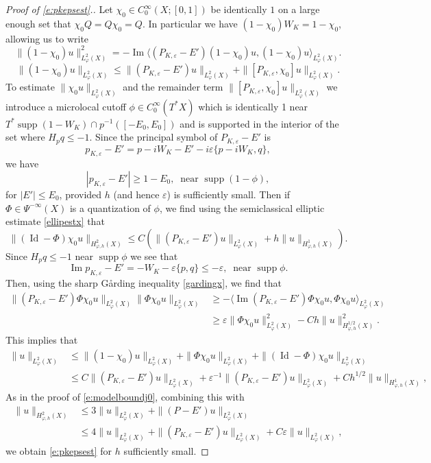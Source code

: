 \documentclass[reqno, 12pt]{amsart}
\newcommand \Oh {\mathcal{O}}
\newcommand \la {\langle}
\newcommand \ra {\rangle}
\newcommand \eps {\varepsilon}
\DeclareMathOperator \im {Im}
\DeclareMathOperator \supp {supp}
\DeclareMathOperator \Id {Id}
\theoremstyle{definition}
\numberwithin{equation}{section}
\numberwithin{prop}{section}
\numberwithin{figure}{section}
\begin{document}
\begin{proof}[Proof of \eqref{e:pkepsest}.]
Let $\chi_0 \in C_0^\infty(X;[0,1])$ be identically $1$ on a large enough set that $\chi_0 Q = Q \chi_0 = Q$. In particular we have $(1-\chi_0) W_K = 1-\chi_0$, allowing us to write
\[
\|(1-\chi_0)u\|_{L^2_\varphi(X)}^2 = -\im \la( P_{K,\eps} - E')(1-\chi_0)u,(1-\chi_0)u\ra_{L^2_\varphi(X)}.
\]
\[
\|(1-\chi_0)u\|_{L^2_\varphi(X)} \le \|(P_{K,\eps} - E' )u\|_{L^2_\varphi(X)} + \|[P_{K,\eps},\chi_0]u\|_{L^2_\varphi(X)}.
\]
To estimate $\|\chi_0 u\|_{L^2_\varphi(X)} $ and the remainder term $\|[P_{K,\eps},\chi_0]u\|_{L^2_\varphi(X)} $ we introduce %
a microlocal cutoff $\phi \in C_0^\infty(T^*X)$ which is identically 1 near $T^*\supp(1-W_K) \cap p^{-1}([-E_0,E_0])$ and is supported in the interior of the set where $H_pq \le -1$. Since the principal symbol of $P_{K,\eps} - E'$ is
\[
p_{K,\eps} - E' = p - i W_K -E' - i\eps \{p - iW_K,q\},
\]
we have
\[
|p_{K,\eps} - E'| \ge 1-E_0, \  \textrm{ near } \supp (1 - \phi),
\]
for $|E'| \le E_0$, provided $h$ (and hence $\eps$) is sufficiently small.  Then if  $\Phi \in \Psi^{-\infty}(X)$ is a quantization of $\phi$, we find using the semiclassical elliptic estimate \eqref{ellipestx} that
\[
\|(\Id - \Phi) \chi_0 u\|_{H^2_{\varphi,h}(X)} \le C\left( \|(P_{K,\eps} - E')u\|_{L^2_\varphi(X)} + h\|u\|_{H^1_{\varphi,h}(X)}\right).
\]
Since $H_pq \le -1$ near $\supp \phi$ we see that
\[
\im p_{K,\eps} - E' = -W_K - \eps \{p,q\} \le - \eps, \ \textrm{ near } \supp \phi.
\]
Then, using the sharp G\aa rding inequality \eqref{gardingx}, we find that
\[\begin{split}
\|(P_{K,\eps} - E')\Phi  \chi_0 u\|_{L^2_\varphi(X)} \|\Phi \chi_0u\|_{L^2_\varphi(X)} &\ge - \la \im(P_{K,\eps} - E')\Phi  \chi_0u, \Phi \chi_0u\ra_{L^2_\varphi(X)} \\
&\ge \eps  \|\Phi\chi_0u\|_{L^2_\varphi(X)}^2 - Ch \|u\|_{H^{1/2}_{\varphi,h}(X)}^2.
\end{split}\]
This implies that
\[\begin{split}
\|u\|_{L^2_\varphi(X)}&\le  \|(1-\chi_0)u\|_{L^2_\varphi(X)} +  \|\Phi \chi_0 u\|_{L^2_\varphi(X)} + \|(\Id-\Phi)\chi_0 u\|_{L^2_\varphi(X)} \\
&\le C \|(P_{K,\eps} - E')u\|_{L^2_\varphi(X)}  + \eps^{-1} \|(P_{K,\eps} - E')u\|_{L^2_\varphi(X)}  + Ch^{1/2}\|u\|_{H^1_{\varphi,h}(X)},
\end{split}\]
As in the proof of \eqref{e:modelboundj0}, combining this with
\begin{equation}\label{e:pkupgrade}\begin{split}
\|u\|_{H^2_{\varphi,h}(X)} &\le 3\|u\|_{L^2_\varphi(X)} + \|(P-E')u\|_{L^2_\varphi(X)} \\&\le 4\|u\|_{L^2_\varphi(X)} + \|(P_{K,\varepsilon}-E')u\|_{L^2_\varphi(X)} + C\eps \|u\|_{L^2_\varphi(X)},
\end{split}\end{equation}
we obtain \eqref{e:pkepsest} for $h$ sufficiently small.
\end{proof}
\end{document}
